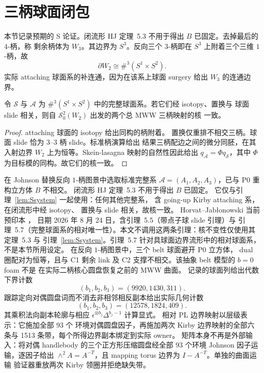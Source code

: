 \section{三柄球面闭包}\label{sec:s-closure}

本节记录预期的 S 论证。闭流形 HJ
定理~5.3 不用于得出 $B$ 已固定。去掉最后的 $4$-柄，称
剩余柄体为 $W_3$。其边界为 $S^3$。反向三个
$3$-柄即在 $S^3$ 上附着三个三维 $1$-柄，故
\[
\partial W_2\cong\#^3(S^1\times S^2).
\]
实际 attaching 球面系的补连通，因为在该系上球面
surgery 给出 $W_3$ 的连通边界。

\begin{lemma}[更换完整球面系下的核不变性]
\label{lem:Ssystem}
令 \(\mathcal S\) 与 \(\mathcal A\) 为
\(\#^3(S^1\times S^2)\) 中的完整球面系。若它们经 isotopy、置换与
球面 slide 相关，则自 \(\mathcal S^2_0(W_2)\) 出发的两个总 MWW 三柄映射的核
一致。
\end{lemma}

\begin{proof}
attaching 球面的 isotopy 给出同构的柄附着。
置换仅重排不相交三柄。球面 slide 恰为
\(3\)--\(3\) 柄 slide。标准柄演算给出
结果三柄配边之间的微分同胚，在其入射边界 \(W_2\) 上为恒等。Skein-lasagna
映射的自然性因此给出 \(q_{\mathcal A}=\Phi q_{\mathcal S}\)，其中
\(\Phi\) 为目标模的同构。故它们的核一致。
\end{proof}

在 Johnson 替换反向
$1$-柄图景中选取标准完整系
\(\mathcal A=(A_1,A_2,A_3)\)，已与 P0 重构立方体 $B$ 不相交。
闭流形 HJ 定理~5.3 不用于得出 $B$ 已固定。
它仅与引理~\ref{lem:Ssystem} 一起使用：任何其他完整系，
含 going-up Kirby attaching 系，在闭流形中经 isotopy、
置换与 slide 相关，故核一致。
Horvat--Jab\l{}onowski 当前预印本 \cite{HorvatJablonowski2025}，
日期 2026 年 8 月 24 日，含引理~5.5（带点子球 slide 引理）与
引理~5.7（完整球面系的相对唯一性）。本文不调用这两条引理：核不变性仅使用其定理~5.3 与
引理~\ref{lem:Ssystem}。引理~5.7 针对具球面边界流形中的相对球面系，不是本节所用设定。
在反向 $1$-柄图景中，三个 belt 球面避开 P0 立方体，
dual 圈配对为恒等，且与 C1 剩余 link 及 C2 支撑不相交。该抽象 belt 模型的 $b=0$ foam 不是
在实际二柄核心圆盘恢复之前的 MWW 曲面。
记录的球面列给出代数下界计数
\[
(b_1,b_2,b_3)=(9920,1430,311).
\]
跟踪定向对偶圆盘词而不消去非相邻相反副本给出实际几何计数
\[
(b_1,b_2,b_3)=(12578,1824,409).
\]
其乘积法向副本轮廓与相应
$\epsilon^{\otimes b_j}\Delta^{b_j-1}$ 计算显式。
相对 PL 边界映射以层级表示：它施加全部 93 个
环境对偶圆盘因子，再施加两次 Kirby 边界映射的全部六条与 1513 条带，每个所得边界副本绑定到实际 owner。
矩阵本身不再是外部输入：将对偶 handlebody 的三个正方形压缩圆盘经全部 93 个环境
Johnson 因子运输，逐因子给出 $\wedge^2A=A^{-T}$，且
mapping torus 边界为 $I-A^{-T}$。单独的曲面运输
验证器重放两次 Kirby 领圈并拒绝缺失带。

